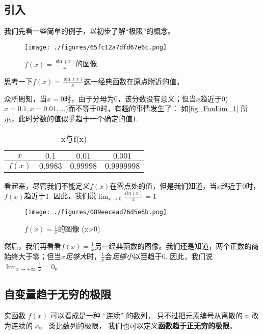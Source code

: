 

\subsection{引入}
我们先看一些简单的例子，以初步了解“极限”的概念。
\begin{example}{}\label{ex_FunLim_1}

\begin{figure}[ht]
\centering
\texttt{[image: ./figures/65fc12a7dfd67e6c.png]}
\caption{$f(x)=\frac{\sin(x)}{x}$的图像} \label{fig_FunLim_1}
\end{figure}
思考一下$f(x)=\frac{\sin(x)}{x}$这一经典函数在原点附近的值。

众所周知，当$x=0$时，由于分母为$0$，该分数没有意义；但当$x$趋近于$0$($x=0.1,x=0.01,...$)而不等于$0$时，有趣的事情发生了： 如\autoref{fig_FunLim_1} 所示，此时分数的值似乎趋于一个确定的值$1$.

\begin{table}[ht]
\centering
\caption{x与f(x)}\label{tab_FunLim_1}
\begin{tabular}{|c|c|c|c|}
\hline
$x$ & $0.1$ & $0.01$ & $0.001$ \\
\hline
$f(x)$ & $0.9983$ & $0.99998$ & $0.9999998$ \\
\hline
\end{tabular}
\end{table}
看起来，尽管我们不能定义$f(x)$在零点处的值，但是我们知道，当$x$趋近于$0$时，$f(x)$趋近于$1$. 因此，我们说$\lim_{x\to0}\frac{sin(x)}{x}=1$
\end{example}

\begin{example}{}
\begin{figure}[ht]
\centering
\texttt{[image: ./figures/089eecead76d5e6b.png]}
\caption{$f(x)=\frac{1}{x}$的图像 (x>0)} \label{fig_FunLim_2}
\end{figure}
然后，我们再看看$f(x)=\frac{1}{x}$另一经典函数的图像。我们还是知道，两个正数的商始终大于零；但当$x$\textsl{足够大}时，$\frac{1}{x}$会\textsl{足够小}以至趋于$0$. 因此，我们说$\lim_{x\to+\infty}\frac{1}{x}=0$。
\end{example}

\subsection{自变量趋于无穷的极限}
实函数 $f(x)$ 可以看成是一种 “连续” 的数列， 只不过把元素编号从离散的 $n$ 改为连续的 $x$。 类比数列的极限， 我们也可以定义\textbf{函数趋于正无穷的极限}。

